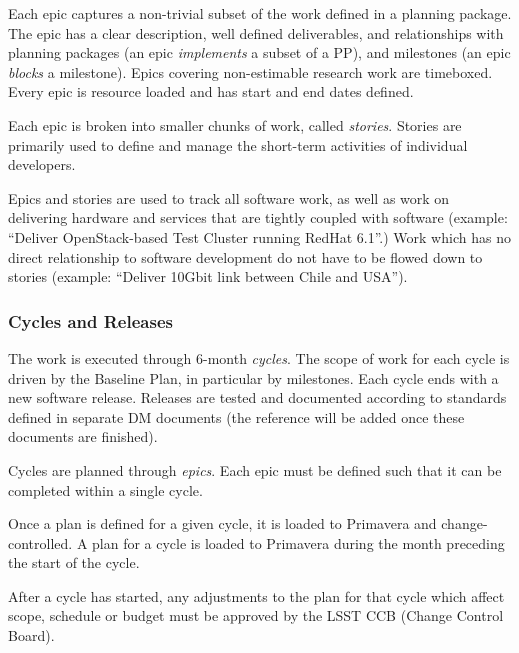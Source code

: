 \documentclass[DM,toc]{lsstdoc}
\newcommand{\sphinxstyleemphasis}{\emph}
\newcommand{\sphinxstyleabbreviation}{\textsc}
\begin{document}
Each epic captures a non-trivial subset of the work defined in a planning package.  The epic has a clear
description, well defined deliverables, and relationships with planning packages (an epic \sphinxstyleemphasis{implements} a subset of a PP),
and milestones (an epic \sphinxstyleemphasis{blocks} a milestone). Epics covering non-estimable research work are timeboxed.
Every epic is resource loaded and has start and end dates defined.

Each epic is broken into smaller chunks of work, called \sphinxstyleemphasis{stories}. Stories are primarily used
to define and manage the short-term activities of individual developers.

Epics and stories are used to track all software work, as well as work on delivering hardware and services
that are tightly coupled with software (example: ``Deliver OpenStack-based Test Cluster running RedHat 6.1''.)
Work which has no direct relationship to software development do not have to be flowed down to stories
(example: ``Deliver 10Gbit link between Chile and USA'').


\subsubsection{Cycles and Releases}
\label{\detokenize{index:cycles-and-releases}}\label{\detokenize{index:id9}}
The work is executed through 6-month \sphinxstyleemphasis{cycles}. The scope of work for each cycle is driven by the
Baseline Plan, in particular by milestones. Each cycle ends with a new software release. Releases are
tested and documented according to standards defined in separate DM documents (the reference will be
added once these documents are finished).

Cycles are planned through \sphinxstyleemphasis{epics}. Each epic must be defined such that it can be completed
within a single cycle.

Once a plan is defined for a given cycle, it is loaded to Primavera and change-controlled. A plan for
a cycle is loaded to Primavera during the month preceding the start of the cycle.

After a cycle has started, any adjustments to the plan for that cycle which affect scope, schedule or budget
must be approved by the LSST \sphinxstyleabbreviation{CCB} (Change Control Board).
\end{document}
